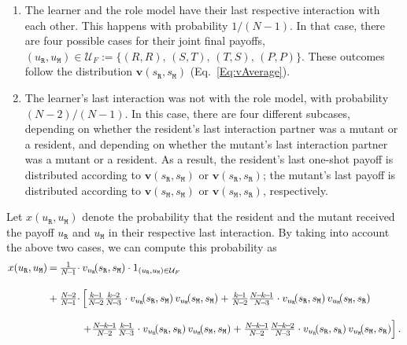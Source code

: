 \documentclass[11pt]{article}
\def\resident{\texttt{R}}
\def\mutant{\texttt{M}}
\def\strategy{s}
\theoremstyle{plainCl1}
\theoremstyle{plainCl2}
\begin{document}

\begin{enumerate}
\item The learner and the role model have their last respective interaction with each other. This happens with probability $1/(N\!-\!1)$. In that case, there are four possible cases for their joint final payoffs, $(u_\resident,u_\mutant)\!\in\!\mathcal{U}_F\!:=\!\big\{(R,R),\,(S,T),\,(T,S),\,(P,P)\big\}$. These outcomes follow the distribution $\mathbf{v}(\strategy_\resident,\strategy_\mutant)$ (Eq.~\eqref{Eq:vAverage}).  
\item The learner's last interaction was not with the role model, with probability $(N\!-\!2)/(N\!-\!1)$. In this case, there are four different subcases, depending on whether the resident's last interaction partner was a mutant or a resident, and depending on whether the mutant's last interaction partner was a mutant or a resident. As a result, the resident's last one-shot payoff is distributed according to $\mathbf{v}(\strategy_\resident,\strategy_\mutant)$ or $\mathbf{v}(\strategy_\resident,\strategy_\resident)$; the mutant's last payoff is distributed according to $\mathbf{v}(\strategy_\mutant,\strategy_\mutant)$ or $\mathbf{v}(\strategy_\mutant,\strategy_\resident)$, respectively. 
\end{enumerate}

\noindent
Let $x(u_\resident,u_\mutant)$ denote the probability that the resident and the mutant received the payoff $u_\resident$ and $u_\mutant$ in their respective last interaction.  
By taking into account the above two cases, we can compute this probability as
\begin{equation}\label{eq:Chi} 
\setlength{\arraycolsep}{1pt} 
\begin{array}{llll}
x(u_\resident,u_\mutant)	 &=
&\frac{1}{N\!-\!1}\cdot  & v_{u_\resident}\!(\strategy_\resident,\strategy_\mutant)\cdot 1_{(u_\resident,u_\mutant)\in \mathcal{U}_F}\\[0.5cm]
&+	
&\frac{N\!-\!2}{N\!-\!1} \cdot 
&\left[ \frac{k\!-\!1}{N\!-\!2}\frac{k\!-\!2}{N\!-\!3}\cdot  v_{u_\resident}\!(\strategy_\resident,\strategy_\mutant) \, v_{u_\mutant}\!(\strategy_\mutant,\strategy_\mutant) + 
 \frac{k\!-\!1}{N\!-\!2}\frac{N\!-\!k\!-\!1}{N\!-\!3}\cdot  v_{u_\resident}\!(\strategy_\resident,\strategy_\mutant) \, v_{u_\mutant}\!(\strategy_\mutant,\strategy_\resident)\right.\\[0.5cm]
&&&\left. +\frac{N\!-\!k\!-\!1}{N\!-\!2}\frac{k\!-\!1}{N\!-\!3} \cdot v_{u_\resident}\!(\strategy_\resident,\strategy_\resident) \,  v_{u_\mutant}\!(\strategy_\mutant,\strategy_\mutant) + 
 \frac{N\!-\!k\!-\!1}{N\!-\!2}\frac{N\!-\!k\!-\!2}{N\!-\!3} \cdot v_{u_\resident}\!(\strategy_\resident,\strategy_\resident) \, v_{u_\mutant}\!(\strategy_\mutant,\strategy_\resident)\right].
\end{array}
\end{equation}
\end{document}
